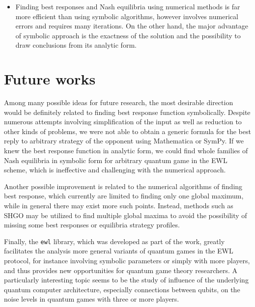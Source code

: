 \documentclass[../main.tex]{subfiles}
\begin{document}
\begin{itemize}
    \item Finding best responses and Nash equilibria using numerical methods is far more efficient than using symbolic algorithms, however involves numerical errors and requires many iterations. On the other hand, the major advantage of symbolic approach is the exactness of the solution and the possibility to draw conclusions from its analytic form.
\end{itemize}

\clearpage
\section{Future works}

Among many possible ideas for future research, the most desirable direction would be definitely related to finding best response function symbolically. Despite numerous attempts involving simplification of the input as well as reduction to other kinds of problems, we were not able to obtain a generic formula for the best reply to arbitrary strategy of the opponent using Mathematica or SymPy. If we knew the best response function in analytic form, we could find whole families of Nash equilibria in symbolic form for arbitrary quantum game in the EWL scheme, which is ineffective and challenging with the numerical approach.

Another possible improvement is related to the numerical algorithms of finding best response, which currently are limited to finding only one global maximum, while in general there may exist more such points. Instead, methods such as SHGO \cite{endres2018simplicial} may be utilized to find multiple global maxima to avoid the possibility of missing some best responses or equilibria strategy profiles.

Finally, the \texttt{ewl} library, which was developed as part of the work, greatly facilitates the analysis more general variants of quantum games in the EWL protocol, for instance involving symbolic parameters or simply with more players, and thus provides new opportunities for quantum game theory researchers. A particularly interesting topic seems to be the study of influence of the underlying quantum computer architecture, especially connections between qubits, on the noise levels in quantum games with three or more players.
\end{document}
